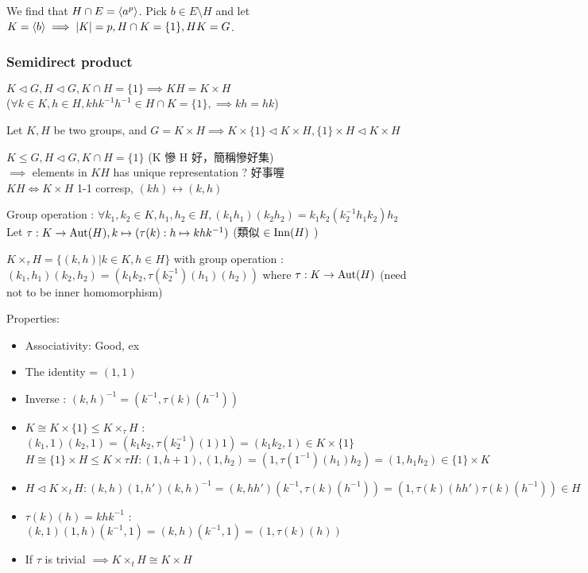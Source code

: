 We find that $H \cap E = \langle a^p\rangle$. Pick $b \in E \setminus H$ and let
$K = \langle b\rangle \implies \lvert K\rvert = p, H \cap K = \{ 1 \}, HK = G$.

\subsubsection{Semidirect product}

\begin{fact}
$K \lhd G, H \lhd G, K \cap H = \{1\} \implies KH = K \times H$ \\
($\forall k\in K, h \in H, khk^{-1} h^{-1} \in H \cap K = \{1\}, \implies kh=hk$)
\end{fact}

\begin{fact}
Let $K, H$ be two groups, and $G=K \times H \implies K \times \{1\} \lhd K \times H, \{1\} \times H \lhd K \times H$
\end{fact}

\begin{observation}
$K \leq G, H \lhd G, K \cap H = \{1\}$ (K 慘 H 好，簡稱慘好集) \\
$\implies$ elements in $KH$ has unique representation ? 好事喔\\
$KH \iff K \times H$ 1-1 corresp, $(kh) \leftrightarrow (k, h)$
\end{observation}

Group operation :
$\forall k_1, k_2 \in K, h_1, h_2 \in H, (k_1 h_1) (k_2 h_2) = k_1 k_2 (k_2^{-1} h_1 k_2) h_2$ \\
Let $\tau : K \to \operatorname{Aut}(H), k \mapsto (\tau(k) : h\mapsto khk^{-1})$ (類似 $\in \operatorname{Inn}(H)$ )

\begin{definition}
  $K \times_{\tau} H = \{(k, h) | k\in K, h \in H\}$ with group operation :
$(k_1, h_1)(k_2, h_2) = (k_1 k_2, \tau(k_2^{-1})(h_1)(h_2))$
where $\tau : K \to \operatorname{Aut}(H)$  (need not to be inner homomorphism)
\end{definition}

Properties:
\begin{itemize}
  \item Associativity: Good, ex
  \item The identity = $(1, 1)$
  \item Inverse : $(k, h)^{-1} = (k^{-1}, \tau(k)(h^{-1}))$
  \item $K \cong K \times \{1\} \leq K \times_{\tau} H$ :
    $(k_1, 1)(k_2, 1) = (k_1 k_2, \tau(k_2^{-1})(1)1) = (k_1 k_2, 1) \in K \times \{1\}$
    $H \cong \{1\} \times H \leq K \times{\tau} H : (1, h+1), (1, h_2) = (1, \tau(1^{-1})(h_1)h_2) = (1, h_1 h_2) \in \{1\} \times K $
  \item $H \lhd K \times_t H : (k, h) (1, h')(k, h)^{-1} = (k, hh')(k^{-1}, \tau(k)(h^{-1}))
    = (1, \tau(k)(hh')\tau(k)(h^{-1})) \in H$

  \item $\tau(k)(h) = khk^{-1}$ :
    $(k, 1)(1, h)(k^{-1}, 1) = (k, h)(k^{-1}, 1) = (1, \tau(k)(h))$
  \item If $\tau$ is trivial $\implies K \times_t H \cong K \times H$
\end{itemize}

